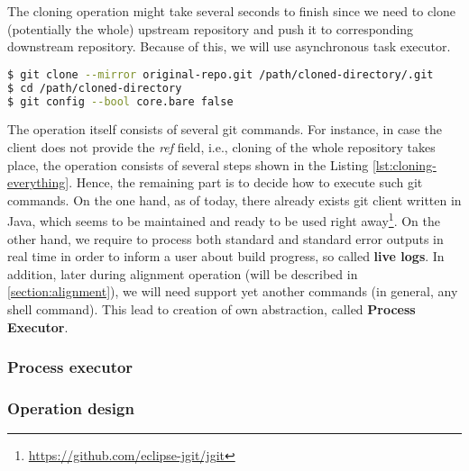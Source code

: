 \documentclass[../main.tex]{subfiles}
\begin{document}
The cloning operation might take several seconds to finish since we need to clone (potentially the whole) upstream repository and push it to corresponding downstream repository. Because of this, we will use asynchronous task executor.

\begin{lstlisting}[numbers=none, language=bash, label={lst:cloning-everything}, caption=Cloning the whole repository]
$ git clone --mirror original-repo.git /path/cloned-directory/.git
$ cd /path/cloned-directory
$ git config --bool core.bare false
\end{lstlisting}

The operation itself consists of several git commands. For instance, in case the client does not provide the \textit{ref} field, i.e., cloning of the whole repository takes place, the operation consists of several steps\cite{gitfaq} shown in the Listing \ref{lst:cloning-everything}. Hence, the remaining part is to decide how to execute such git commands. On the one hand, as of today, there already exists git client written in Java, which seems to be maintained and ready to be used right away\footnote{\url{https://github.com/eclipse-jgit/jgit}}. On the other hand, we require to process both standard and standard error outputs in real time in order to inform a user about build progress, so called \textbf{live logs}. In addition, later during alignment operation (will be described in \ref{section:alignment}), we will need support yet another commands (in general, any shell command). This lead to creation of own abstraction, called \textbf{Process Executor}.

\subsubsection*{Process executor}


\subsubsection*{Operation design}

\end{document}
